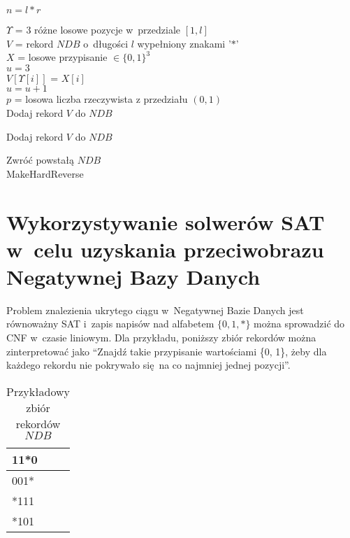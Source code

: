 \begin{algorithm}[H]
    \SetAlgoLined
    $n = l * r$\\
    {
        $\Upsilon$ = $3$ różne losowe pozycje w~przedziale $[1, l]$\\
        $V$ = rekord $NDB$ o~długości $l$ wypełniony znakami '$*$'\\
        $X$ = losowe przypisanie $\in \{0,1\}^3$\\ 
        
        $u = 3$\\ 
        {
            $V[\Upsilon[i]]$ = $X[i]$\\  
            {
                $u = u + 1$\\
            }
        }    
        {
            $p$ = losowa liczba rzeczywista z przedziału $(0,1)$\\
            {
                Dodaj rekord $V$ do $NDB$\\
            }    
        }
        
        Dodaj rekord $V$ do $NDB$
    } 
    
    Zwróć powstałą $NDB$\\
    \caption{MakeHardReverse}
    \label{alg:hybrid-makehard}
\end{algorithm}


\section{Wykorzystywanie solwerów SAT w~celu uzyskania przeciwobrazu Negatywnej Bazy Danych}

Problem znalezienia ukrytego ciągu w~Negatywnej Bazie Danych jest równoważny SAT i~zapis napisów nad alfabetem 
$\{0, 1, *\}$ można sprowadzić do CNF w~czasie liniowym.
Dla przykładu, poniższy zbiór rekordów można zinterpretować jako 
\enquote{Znajdź takie przypisanie wartościami \{0, 1\}, żeby dla każdego rekordu nie pokrywało się na co najmniej jednej pozycji}.

\begin{table}[h]
    
    \centering
    \label{Tbl:NDB-sat-example}
    \begin{tabular}{|l|}
        \hline
        11*0 \\ \hline
        001* \\ \hline
        *111 \\ \hline
        *101 \\ \hline
    \end{tabular}
    \caption{Przykładowy zbiór rekordów $NDB$}
\end{table}

